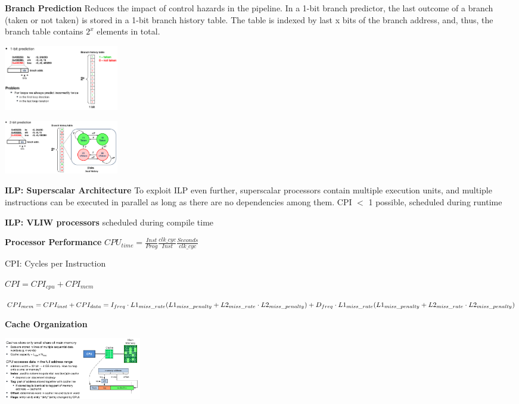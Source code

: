 \documentclass[english]{latex4ei/latex4ei_sheet}
\begin{document}
\textbf{Branch Prediction} Reduces the impact of control hazards in the pipeline. In a 1-bit branch predictor, the last outcome of a branch (taken or not taken) is stored in a 1-bit branch history table. The table is indexed by last x bits of the branch address, and, thus, the branch table contains $2^x$ elements in total.
\begin{center}
    \includegraphics[width = 5cm]{images/4.ProcessorArchitecture/1BitPred.png}
\end{center}

\begin{center}
    \includegraphics[width = 5cm]{images/4.ProcessorArchitecture/2BitPred.png}
\end{center}



\textbf{ILP: Superscalar Architecture} To exploit ILP even further, superscalar processors contain multiple execution units, and multiple instructions can be executed in parallel as long as there are no dependencies among them. CPI $<$ 1 possible, scheduled during runtime

\textbf{ILP: VLIW processors} scheduled during compile time

\textbf{Processor Performance} $CPU_{time} = \frac{Inst}{Prog} \frac{clk\_cyc}{Inst} \frac{Seconds}{clk\_cyc}$

CPI: Cycles per Instruction

$CPI = CPI_{cpu} + CPI_{mem}$

$CPI_{mem} = CPI_{inst} + CPI_{data} 
\newline = I_{freq} \cdot L1_{miss\_rate} (L1_{miss\_penalty} + L2_{miss\_rate} \cdot L2_{miss\_penalty}) + D_{freq} \cdot L1_{miss\_rate} (L1_{miss\_penalty} + L2_{miss\_rate} \cdot L2_{miss\_penalty})$

\textbf{Cache Organization}

\begin{center}
    \includegraphics[width = 6cm]{images/4.ProcessorArchitecture/cache.png}
\end{center}
\end{document}
